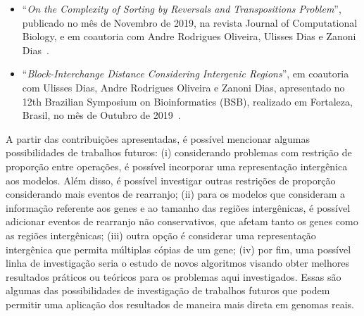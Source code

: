 \begin{itemize}
  \item ``\textit{On the Complexity of Sorting by Reversals and Transpositions Problem}'', publicado no mês de Novembro de 2019, na revista Journal of Computational Biology, e em coautoria com Andre Rodrigues Oliveira, Ulisses Dias e Zanoni Dias~\cite{2019b-oliveira-etal}.

  \item ``\textit{Block-Interchange Distance Considering Intergenic Regions}'', em coautoria com Ulisses Dias, Andre Rodrigues Oliveira e Zanoni Dias, apresentado no 12th Brazilian Symposium on Bioinformatics (BSB), realizado em Fortaleza, Brasil, no mês de Outubro de 2019~\cite{2019-dias-etal}.
\end{itemize}

A partir das contribuições apresentadas, é possível mencionar algumas possibilidades de trabalhos futuros: (i) considerando problemas com restrição de proporção entre operações, é possível incorporar uma representação intergênica aos modelos. Além disso, é possível investigar outras restrições de proporção considerando mais eventos de rearranjo; (ii) para os modelos que consideram a informação referente aos genes e ao tamanho das regiões intergênicas, é possível adicionar eventos de rearranjo não conservativos, que afetam tanto os genes como as regiões intergênicas; (iii) outra opção é considerar uma representação intergênica que permita múltiplas cópias de um gene; (iv) por fim, uma possível linha de investigação seria o estudo de novos algoritmos visando obter melhores resultados práticos ou teóricos para os problemas aqui investigados.  Essas são algumas das possibilidades de investigação de trabalhos futuros que podem permitir uma aplicação dos resultados de maneira mais direta em genomas reais. 